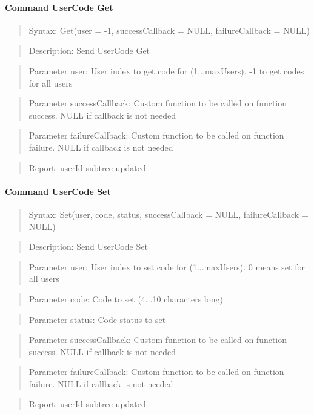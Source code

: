 \paragraph{Command UserCode Get}
\begin{quote}Syntax: Get(user = -1, successCallback = NULL, failureCallback = NULL)\end{quote}
\begin{quote}Description: Send UserCode Get\end{quote}
\begin{quote}Parameter user: User index to get code for (1...maxUsers). -1 to get codes for all users\end{quote}
\begin{quote}Parameter successCallback: Custom function to be called on function success. NULL if callback is not needed\end{quote}
\begin{quote}Parameter failureCallback: Custom function to be called on function failure. NULL if callback is not needed\end{quote}
\begin{quote}Report: userId subtree updated\end{quote}

\paragraph{Command UserCode Set}
\begin{quote}Syntax: Set(user, code, status, successCallback = NULL, failureCallback = NULL)\end{quote}
\begin{quote}Description: Send UserCode Set\end{quote}
\begin{quote}Parameter user: User index to set code for (1...maxUsers). 0 means set for all users\end{quote}
\begin{quote}Parameter code: Code to set (4...10 characters long)\end{quote}
\begin{quote}Parameter status: Code status to set\end{quote}
\begin{quote}Parameter successCallback: Custom function to be called on function success. NULL if callback is not needed\end{quote}
\begin{quote}Parameter failureCallback: Custom function to be called on function failure. NULL if callback is not needed\end{quote}
\begin{quote}Report: userId subtree updated\end{quote}

